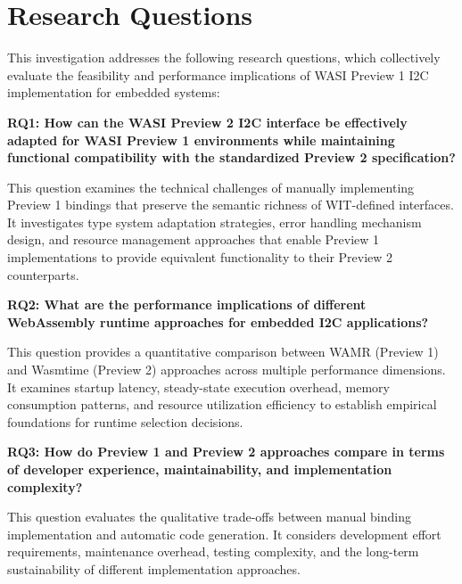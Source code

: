 \section{Research Questions}
\label{sec:research-questions}

This investigation addresses the following research questions, which collectively evaluate the feasibility and performance implications of WASI Preview 1 I2C implementation for embedded systems:

\textbf{RQ1: How can the WASI Preview 2 I2C interface be effectively adapted for WASI Preview 1 environments while maintaining functional compatibility with the standardized Preview 2 specification?}

This question examines the technical challenges of manually implementing Preview 1 bindings that preserve the semantic richness of WIT-defined interfaces. It investigates type system adaptation strategies, error handling mechanism design, and resource management approaches that enable Preview 1 implementations to provide equivalent functionality to their Preview 2 counterparts.

\textbf{RQ2: What are the performance implications of different WebAssembly runtime approaches for embedded I2C applications?}

This question provides a quantitative comparison between WAMR (Preview 1) and Wasmtime (Preview 2) approaches across multiple performance dimensions. It examines startup latency, steady-state execution overhead, memory consumption patterns, and resource utilization efficiency to establish empirical foundations for runtime selection decisions.

\textbf{RQ3: How do Preview 1 and Preview 2 approaches compare in terms of developer experience, maintainability, and implementation complexity?}

This question evaluates the qualitative trade-offs between manual binding implementation and automatic code generation. It considers development effort requirements, maintenance overhead, testing complexity, and the long-term sustainability of different implementation approaches.




